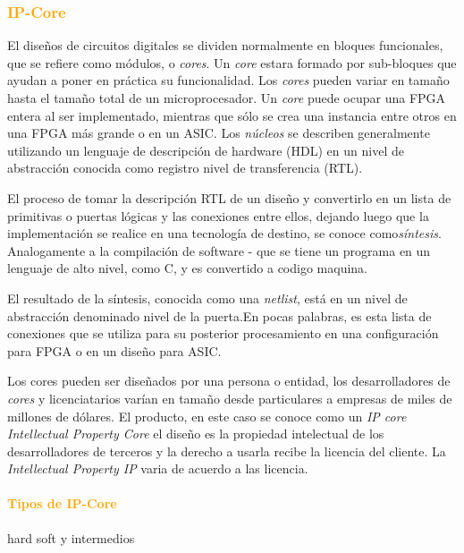 \documentclass[a4paper,11pt]{article}
\begin{document}
	\subsubsection{\textcolor{orange}{ IP-Core}}

El diseños de circuitos digitales se dividen normalmente en bloques funcionales, que se refiere como módulos, o \textit{cores}. Un \textit{core} estara formado por sub-bloques que ayudan a poner en práctica su funcionalidad. Los \textit{cores} pueden variar en tamaño hasta el tamaño total de un microprocesador. Un \textit{core} puede ocupar una FPGA entera al ser implementado, mientras que sólo se crea una instancia entre otros en una FPGA más grande o en un ASIC. Los \textit{núcleos} se describen generalmente utilizando un lenguaje de descripción de hardware (HDL) en un nivel de abstracción conocida como registro nivel de transferencia (RTL).

El proceso de tomar la descripción RTL de un diseño y convertirlo en un lista de primitivas o puertas lógicas y las conexiones entre ellos, dejando luego que la  implementación se realice en una tecnología de destino, se conoce como\textit{síntesis}. Analogamente a la compilación de software - que se tiene un programa en un lenguaje de alto nivel, como C, y  es convertido a codigo maquina. 

El resultado de la síntesis, conocida como una \textit{netlist}, está en un nivel de abstracción denominado nivel de la puerta.En pocas palabras, es esta lista de conexiones que se utiliza para su posterior procesamiento en una configuración para FPGA o en un diseño para ASIC.

Los cores pueden ser diseñados por una persona o entidad, los desarrolladores de \textit{cores} y licenciatarios varían en tamaño desde particulares a empresas de miles de millones de dólares. El producto, en este caso se conoce como un \textit{IP core  Intellectual Property Core} el diseño es la propiedad intelectual de los desarrolladores de terceros y la derecho a usarla recibe la licencia del cliente. La \textit{Intellectual Property IP} varia  de  acuerdo a las licencia.

			\paragraph{\textcolor{orange}{ Tipos de IP-Core}}
hard soft y intermedios
\end{document}
